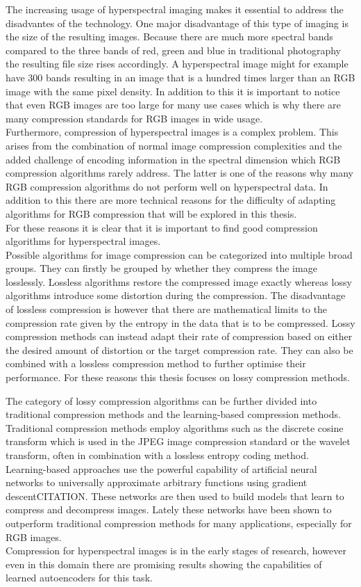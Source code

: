 The increasing usage of hyperspectral imaging makes it essential to address the disadvantes of the technology. One major disadvantage of this type of imaging is the size of the resulting images. Because there are much more spectral bands compared to the three bands of red, green and blue in traditional photography the resulting file size rises accordingly. A hyperspectral image might for example have 300 bands resulting in an image that is a hundred times larger than an RGB image with the same pixel density. In addition to this it is important to notice that even RGB images are too large for many use cases which is why there are many compression standards for RGB images in wide usage.\\
Furthermore, compression of hyperspectral images is a complex problem. This arises from the combination of normal image compression complexities and the added challenge of encoding information in the spectral dimension which RGB compression algorithms rarely address. The latter is one of the reasons why many RGB compression algorithms do not perform well on hyperspectral data. In addition to this there are more technical reasons for the difficulty of adapting algorithms for RGB compression that will be explored in this thesis.\\
For these reasons it is clear that it is important to find good compression algorithms for hyperspectral images.\\
Possible algorithms for image compression can be categorized into multiple broad groups. They can firstly be grouped by whether they compress the image losslessly. Lossless algorithms restore the compressed image exactly whereas lossy algorithms introduce some distortion during the compression. The disadvantage of lossless compression is however that there are mathematical limits to the compression rate given by the entropy in the data that is to be compressed. Lossy compression methods can instead adapt their rate of compression based on either the desired amount of distortion or the target compression rate. They can also be combined with a lossless compression method to further optimise their performance. For these reasons this thesis focuses on lossy compression methods.

The category of lossy compression algorithms can be further divided into traditional compression methods and the learning-based compression methods. Traditional compression methods employ algorithms such as the discrete cosine transform which is used in the JPEG image compression standard or the wavelet transform, often in combination with a lossless entropy coding method.\\
Learning-based approaches use the powerful capability of artificial neural networks to universally approximate arbitrary functions using gradient descentCITATION. These networks are then used to build models that learn to compress and decompress images. Lately these networks have been shown to outperform traditional compression methods for many applications, especially for RGB images.\\
Compression for hyperspectral images is in the early stages of research, however even in this domain there are promising results showing the capabilities of learned autoencoders for this task.


